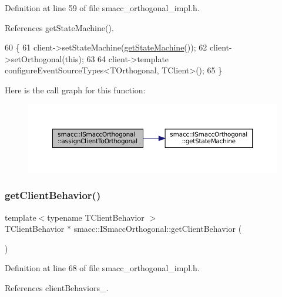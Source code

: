 Definition at line 59 of file smacc\+\_\+orthogonal\+\_\+impl.\+h.



References get\+State\+Machine().


\begin{DoxyCode}
60 \{
61     client->setStateMachine(\hyperlink{classsmacc_1_1ISmaccOrthogonal_aae265ec480b8ed552ddc79afd2d93a62}{getStateMachine}());
62     client->setOrthogonal(\textcolor{keyword}{this});
63 
64     client->template configureEventSourceTypes<TOrthogonal, TClient>();
65 \}
\end{DoxyCode}
Here is the call graph for this function\+:
\nopagebreak
\begin{figure}[H]
\begin{center}
\leavevmode
\includegraphics[width=350pt]{classsmacc_1_1ISmaccOrthogonal_a2241e4d2018f5bd74bd1925f19791606_cgraph}
\end{center}
\end{figure}
\mbox{\label{classsmacc_1_1ISmaccOrthogonal_a463bb235217511954feb4133394c4c61}} 
\subsubsection{\texorpdfstring{get\+Client\+Behavior()}{getClientBehavior()}}
{\footnotesize\ttfamily template$<$typename T\+Client\+Behavior $>$ \\
T\+Client\+Behavior $\ast$ smacc\+::\+I\+Smacc\+Orthogonal\+::get\+Client\+Behavior (\begin{DoxyParamCaption}{ }\end{DoxyParamCaption})}



Definition at line 68 of file smacc\+\_\+orthogonal\+\_\+impl.\+h.



References client\+Behaviors\+\_\+.


